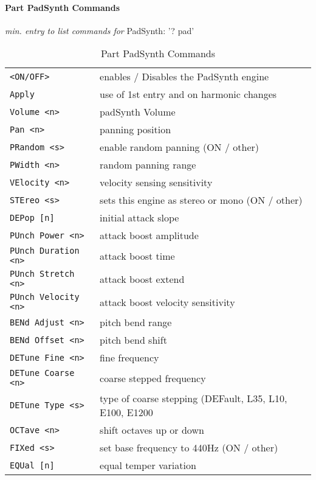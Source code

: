 \paragraph{Part PadSynth Commands}
\label{paragraph:command_line_part_padsynth_commands}
\textsl{min. entry to list commands for} PadSynth: '? pad'
\begin{center}
\begin{longtable}{p{5cm} p{13cm}}

\caption[Part PadSynth Commands]{Part PadSynth Commands} \\
\texttt{<ON/OFF>} &
   enables / Disables the PadSynth engine \\
\texttt{Apply} &
   use of 1st entry and on harmonic changes \\
\texttt{Volume <n>} &
   padSynth Volume \\
\texttt{Pan <n>} &
   panning position \\
\texttt{PRandom <s>} &
   enable random panning (ON / other) \\
\texttt{PWidth <n>} &
   random panning range \\
\texttt{VElocity <n>} &
   velocity sensing sensitivity \\
\texttt{STEreo <s>} &
   sets this engine as stereo or mono (ON / other) \\
\texttt{DEPop [n]} &
   initial attack slope \\
\texttt{PUnch Power <n>} &
   attack boost amplitude \\
\texttt{PUnch Duration <n>} &
   attack boost time \\
\texttt{PUnch Stretch <n>} &
   attack boost extend \\
\texttt{PUnch Velocity <n>} &
   attack boost velocity sensitivity \\
\texttt{BENd Adjust <n>} &
   pitch bend range \\
\texttt{BENd Offset <n>} &
   pitch bend shift \\
\texttt{DETune Fine <n>} &
   fine frequency \\
\texttt{DETune Coarse <n>} &
   coarse stepped frequency \\
\texttt{DETune Type <s>} &
   type of coarse stepping (DEFault, L35, L10, E100, E1200 \\
\texttt{OCTave <n>} &
   shift octaves up or down \\
\texttt{FIXed <s>} &
   set base frequency to 440Hz (ON / other) \\
\texttt{EQUal [n]} &
   equal temper variation \\

\end{longtable}
\end{center}
